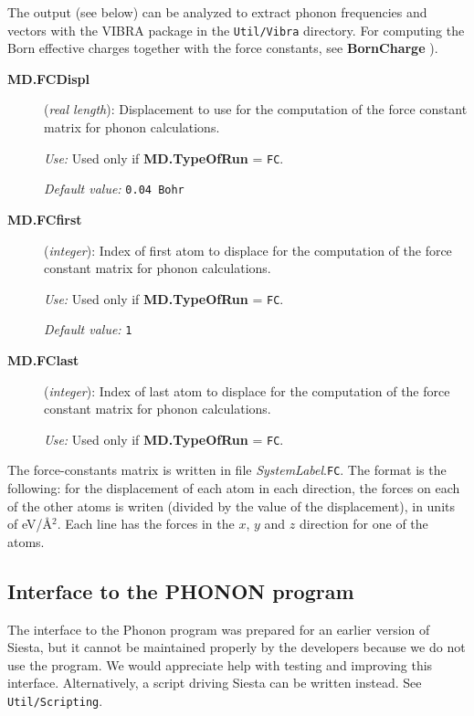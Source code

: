 \documentclass[11pt]{article}
\begin{document}
The output (see below) can be analyzed to extract phonon frequencies
and vectors with the VIBRA package in the {\tt Util/Vibra}
directory. For computing the Born effective charges together with the
force constants, see {\bf BornCharge} ).

\begin{description}
\item[{\bf MD.FCDispl}] ({\it real length}):
Displacement to use for the computation of the force constant
matrix for phonon calculations.

{\it Use:} Used only if {\bf MD.TypeOfRun} = {\tt FC}.

{\it Default value:}  {\tt 0.04 Bohr}

\item[{\bf MD.FCfirst}] ({\it integer}):
Index of first atom to displace for the computation of the force constant
matrix for phonon calculations.

{\it Use:} Used only if {\bf MD.TypeOfRun} = {\tt FC}.

{\it Default value:}  {\tt 1}

\item[{\bf MD.FClast}] ({\it integer}):
Index of last atom to displace for the computation of the force constant
matrix for phonon calculations.

{\it Use:} Used only if {\bf MD.TypeOfRun} = {\tt FC}.
\end{description}

The force-constants matrix is written in file {\it SystemLabel}.{\tt FC}.
The format is the following: for the displacement of
each atom in each direction, the forces on each of the other
atoms is writen (divided by the value of the displacement),
in units of eV/\AA$^2$. Each line has the forces in the $x$, $y$
and $z$ direction for one of the atoms.


\subsection{Interface to the {\sc PHONON} program}
\label{sec:phonon-interface}

The interface to the {\sc Phonon} program was prepared for an earlier
version of {\sc Siesta}, but it cannot be maintained properly by the
developers because we do not use the program. We would appreciate help
with testing and improving this interface. Alternatively, a script
driving Siesta can be written instead. See {\tt Util/Scripting}.
\end{document}
